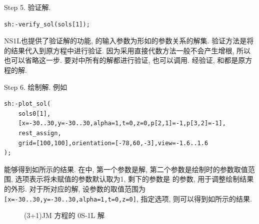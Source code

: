 Step 5. 验证解.
\begin{verbatim}
sh:-verify_sol(sols[1]);
\end{verbatim}
NS1L也提供了验证解的功能, 的输入参数为形如的参数关系的解集. 验证方法是将的结果代入到原方程中进行验证. 因为采用直接代数方法一般不会产生增根, 所以也可以省略这一步. 要对中所有的解都进行验证, 也可以调用. 经验证, 和都是原方程的解.  

Step 6. 绘制解. 例如
\begin{verbatim}
sh:-plot_sol(
    sols0[1],
    [x=-30..30,y=-30..30,alpha=1,t=0,z=0,p[2,1]=-1,p[3,2]=-1],
    rest_assign,
    grid=[100,100],orientation=[-78,60,-3],view=-1.6..1.6
);
\end{verbatim}
能够得到如所示的结果. 在中, 第一个参数是解, 第二个参数是绘制时的参数取值范围, 选项表示将未赋值的参数默认取为1, 剩下的参数是  的参数, 用于调整绘制结果的外形. 对于所对应的解, 设参数的取值范围为 \verb|[x=-30..30,y=-30..30,alpha=1,t=0,z=0]|, 指定选项, 则可以得到如所示的结果.

\begin{figure}[htbp]
\centering
{}
\caption{(3+1)JM 方程的 0S-1L 解}
\end{figure}

